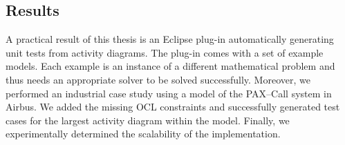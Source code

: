 \subsection{Results}
A practical result of this thesis is an Eclipse plug-in automatically generating unit tests from activity diagrams. The plug-in comes with a set of example models. Each example is an instance of a different mathematical problem and thus needs an appropriate solver to be solved successfully. Moreover, we performed an industrial case study using a model of the PAX--Call system in Airbus. We added the missing OCL constraints and successfully generated test cases for the largest activity diagram within the model. Finally, we experimentally determined the scalability of the implementation.

